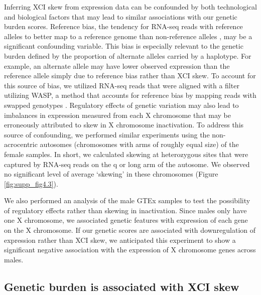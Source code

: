Inferring XCI skew from expression data can be confounded by both technological and biological factors that may lead to similar associations with our genetic burden scores. Reference bias, the tendency for RNA-seq reads with reference alleles to better map to a reference genome than non-reference alleles \cite{Stevenson2013-cg}, may be a significant confounding variable. This bias is especially relevant to the genetic burden defined by the proportion of alternate alleles carried by a haplotype. For example, an alternate allele may have lower observed expression than the reference allele simply due to reference bias rather than XCI skew. To account for this source of bias, we utilized RNA-seq reads that were aligned with a filter utilizing WASP, a method that accounts for reference bias by mapping reads with swapped genotypes \cite{Van_de_Geijn2015-oy}.
Regulatory effects of genetic variation may also lead to imbalances in expression \cite{Castel2018-wo} measured from each X chromosome that may be erroneously attributed to skew in X chromosome inactivation. To address this source of confounding, we performed similar experiments using the non-acrocentric autosomes (chromosomes with arms of roughly equal size) of the female samples. In short, we calculated skewing at heterozygous sites that were captured by RNA-seq reads on the q or long arm of the autosome. We observed no significant level of average ‘skewing’ in these chromosomes (Figure \ref{fig:supp_fig4.3}). 



We also performed an analysis of the male GTEx samples to test the possibility of regulatory effects rather than skewing in inactivation. Since males only have one X chromosome, we associated genetic features with expression of each gene on the X chromosome. If our genetic scores are associated with downregulation of expression rather than XCI skew, we anticipated this experiment to show a significant negative association with the expression of X chromosome genes across males.

\subsection{Genetic burden is associated with XCI skew}

